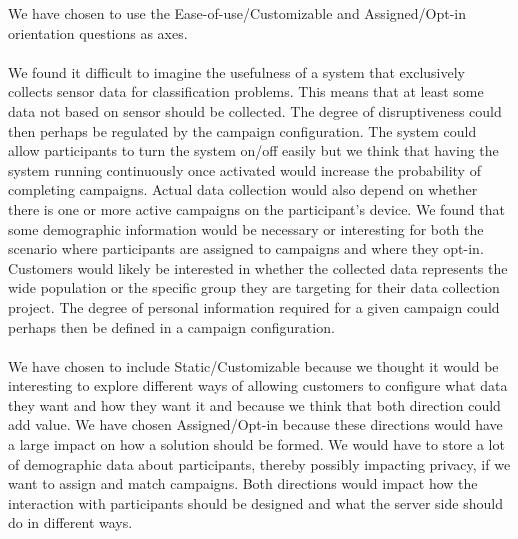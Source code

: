 We have chosen to use the Ease-of-use/Customizable and Assigned/Opt-in orientation questions as axes. 
\\\\
We found it difficult to imagine the usefulness of a system that exclusively collects sensor data for classification problems. This means that at least some data not based on sensor should be collected. The degree of disruptiveness could then perhaps be regulated by the campaign configuration. 
The system could allow participants to turn the system on/off easily but we think that having the system running continuously once activated would increase the probability of completing campaigns. Actual data collection would also depend on whether there is one or more active campaigns on the participant's device.
We found that some demographic information would be necessary or interesting for both the scenario where participants are assigned to campaigns and where they opt-in. Customers would likely be interested in whether the collected data represents the wide population or the specific group they are targeting for their data collection project. The degree of personal information required for a given campaign could perhaps then be defined in a campaign configuration. 
\\\\
We have chosen to include Static/Customizable because we thought it would be interesting to explore different ways of allowing customers to configure what data they want and how they want it and because we think that both direction could add value. We have chosen Assigned/Opt-in because these directions would have a large impact on how a solution should be formed. We would have to store a lot of demographic data about participants, thereby possibly impacting privacy, if we want to assign and match campaigns. Both directions would impact how the interaction with participants should be designed and what the server side should do in different ways.
